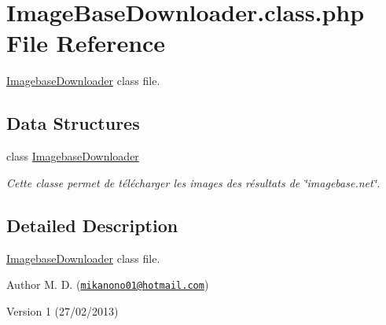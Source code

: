\hypertarget{_image_base_downloader_8class_8php}{\section{Image\-Base\-Downloader.\-class.\-php File Reference}
\label{_image_base_downloader_8class_8php}
}


\hyperlink{class_imagebase_downloader}{Imagebase\-Downloader} class file.  


\subsection*{Data Structures}
\begin{DoxyCompactItemize}
\item 
class \hyperlink{class_imagebase_downloader}{Imagebase\-Downloader}
\begin{DoxyCompactList}\small\item\em Cette classe permet de télécharger les images des résultats de \char`\"{}imagebase.\-net\char`\"{}. \end{DoxyCompactList}\end{DoxyCompactItemize}


\subsection{Detailed Description}
\hyperlink{class_imagebase_downloader}{Imagebase\-Downloader} class file. \begin{DoxyAuthor}{Author}
M. D. (\href{mailto:mikanono01@hotmail.com}{\tt mikanono01@hotmail.\-com}) 
\end{DoxyAuthor}
\begin{DoxyVersion}{Version}
1 (27/02/2013) 
\end{DoxyVersion}
